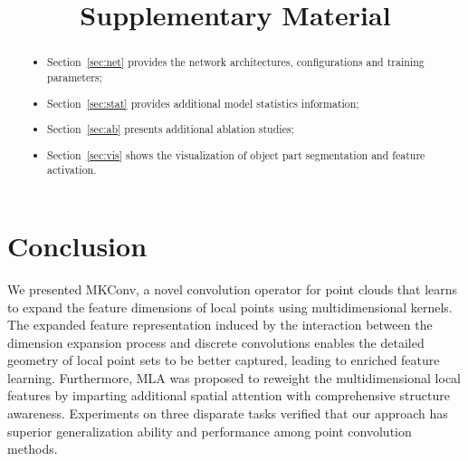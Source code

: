 \documentclass[preprint,12pt]{elsarticle}
\begin{document}
\section{Conclusion}
\label{con}

We presented MKConv, a novel convolution operator for point clouds that learns to expand the feature dimensions of local points using multidimensional kernels. The expanded feature representation induced by the interaction between the dimension expansion process and discrete convolutions enables the detailed geometry of local point sets to be better captured, leading to enriched feature learning. Furthermore, MLA was proposed to reweight the multidimensional local features by imparting additional spatial attention with comprehensive structure awareness. Experiments on three disparate tasks verified that our approach has superior generalization ability and performance among point convolution methods.

\title{\\\vspace{0.3cm} \normalfont Supplementary Material}



\begin{abstract}
	\begin{itemize}
		\setlength{\itemsep}{0ex}
		\item Section~\ref{sec:net} provides the network architectures, configurations and training
		parameters;
		\item Section~\ref{sec:stat} provides additional model statistics information;
		\item Section~\ref{sec:ab} presents additional ablation studies;
		\item Section~\ref{sec:vis} shows the visualization of object part segmentation and feature activation.
	\end{itemize} 
\end{abstract}
\end{document}
